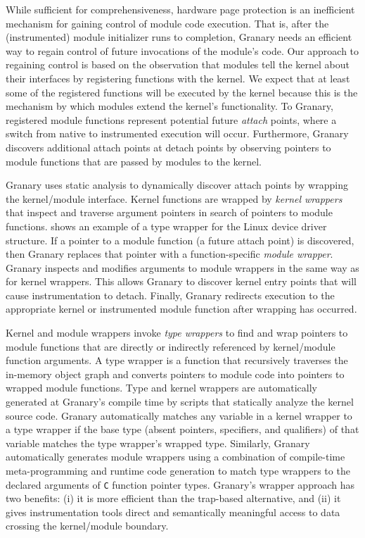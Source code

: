\documentclass[preprint]{sigplanconf}
\begin{document}
While sufficient for comprehensiveness, hardware page protection is an inefficient mechanism for gaining control of module code execution. That is, after the (instrumented) module initializer runs to completion, Granary needs an efficient way to regain control of future invocations of the module's code. Our approach to regaining control is based on the observation that modules tell the kernel about their interfaces by registering functions with the kernel. We expect that at least some of the registered functions will be executed by the kernel because this is the mechanism by which modules extend the kernel's functionality. To Granary, registered module functions represent potential future \emph{attach} points, where a switch from native to instrumented execution will occur. Furthermore, Granary discovers additional attach points at detach points by observing pointers to module functions that are passed by modules to the kernel.

Granary uses static analysis to dynamically discover attach points by wrapping the kernel/module interface. Kernel functions are wrapped by \emph{kernel wrappers} that inspect and traverse argument pointers in search of pointers to module functions.  shows an example of a type wrapper for the Linux device driver structure. If a pointer to a module function (a future attach point) is discovered, then Granary replaces that pointer with a function-specific \emph{module wrapper}. Granary inspects and modifies arguments to module wrappers in the same way as for kernel wrappers. This allows Granary to discover kernel entry points that will cause instrumentation to detach. Finally, Granary redirects execution to the appropriate kernel or instrumented module function after wrapping has occurred.

Kernel and module wrappers invoke \emph{type wrappers} to find and wrap pointers to module functions that are directly or indirectly referenced by kernel/module function arguments. A type wrapper is a function that recursively  traverses the in-memory object graph and converts pointers to module code into pointers to wrapped module functions. Type and kernel wrappers are automatically generated at Granary's compile time by scripts that statically analyze the kernel source code. Granary automatically matches any variable in a kernel wrapper to a type wrapper if the base type (absent pointers, specifiers, and qualifiers) of that variable matches the type wrapper's wrapped type. Similarly, Granary automatically generates module wrappers using a combination of compile-time meta-programming and runtime code generation to match type wrappers to the declared arguments of \texttt{C} function pointer types.  Granary's wrapper approach has two benefits: (i) it is more efficient than the trap-based alternative, and (ii) it gives instrumentation tools direct and semantically meaningful access to data crossing the kernel/module boundary.
\end{document}
